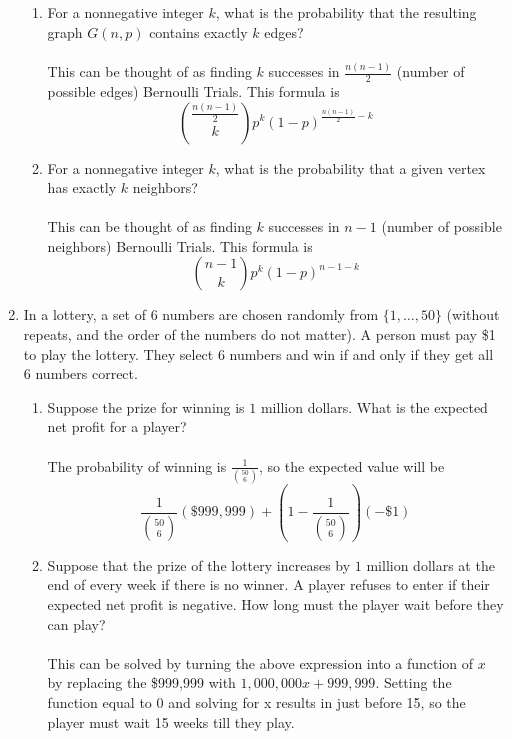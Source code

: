\documentclass[12pt]{article}
\begin{document}
\begin{enumerate}
\begin{enumerate}
\item For a nonnegative integer $k$, what is the probability that the resulting graph $G(n,p)$ contains exactly $k$ edges?\\\\
This can be thought of as finding $k$ successes in $\frac{n(n-1)}{2}$ (number of possible edges) Bernoulli Trials. This formula is \[\binom{\frac{n(n-1)}{2}}{k}p^k(1-p)^{\frac{n(n-1)}{2}-k}\]

\item For a nonnegative integer $k$, what is the probability that a given vertex has exactly $k$ neighbors?\\\\
This can be thought of as finding $k$ successes in $n-1$ (number of possible neighbors) Bernoulli Trials. This formula is \[\binom{n-1}{k}p^k(1-p)^{n-1-k}\]

\end{enumerate}
\medskip

\item In a lottery, a set of 6 numbers are chosen randomly from $\{1, \ldots, 50\}$ (without repeats, and the order of the numbers do not matter). A person must pay \$1 to play the lottery. They select 6 numbers and win if and only if they get all 6 numbers correct.

\begin{enumerate}
\item Suppose the prize for winning is $1$ million dollars. What is the expected net profit for a player?\\\\
The probability of winning is $\frac{1}{\binom{50}{6}}$, so the expected value will be \[\frac{1}{\binom{50}{6}}(\$999,999)+ (1-\frac{1}{\binom{50}{6}})(-\$1)\]

\item Suppose that the prize of the lottery increases by $1$ million dollars at the end of every week if there is no winner. A player refuses to enter if their expected net profit is negative. How long must the player wait before they can play?\\\\
This can be solved by turning the above expression into a function of $x$ by replacing the \$999,999 with $1,000,000x+999,999$. Setting the function equal to 0 and solving for x results in just before 15, so the player must wait 15 weeks till they play.
\end{enumerate}

\medskip



\end{enumerate}
\end{document}
